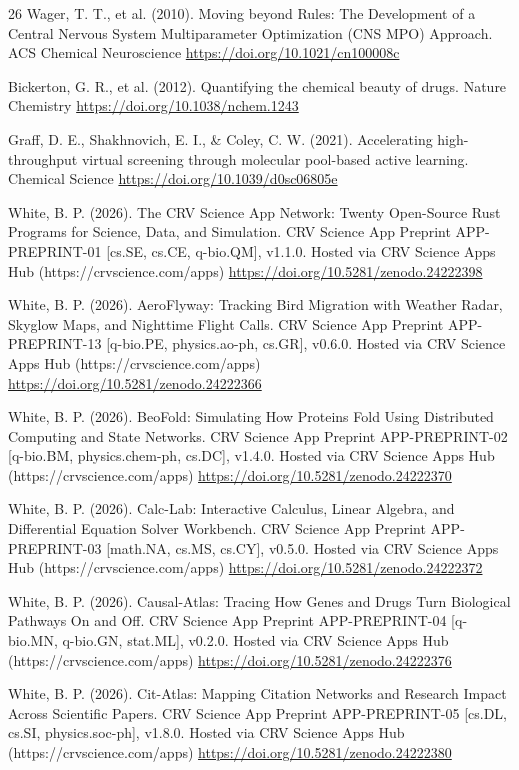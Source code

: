 \documentclass[10pt,letterpaper]{article}
\begin{document}
\begin{thebibliography}{26}
 Wager, T. T., et al. (2010). Moving beyond Rules: The Development of a Central Nervous System Multiparameter Optimization (CNS MPO) Approach. ACS Chemical Neuroscience \url{https://doi.org/10.1021/cn100008c}

 Bickerton, G. R., et al. (2012). Quantifying the chemical beauty of drugs. Nature Chemistry \url{https://doi.org/10.1038/nchem.1243}

 Graff, D. E., Shakhnovich, E. I., \& Coley, C. W. (2021). Accelerating high-throughput virtual screening through molecular pool-based active learning. Chemical Science \url{https://doi.org/10.1039/d0sc06805e}

 White, B. P. (2026). The CRV Science App Network: Twenty Open-Source Rust Programs for Science, Data, and Simulation. CRV Science App Preprint APP-PREPRINT-01 [cs.SE, cs.CE, q-bio.QM], v1.1.0. Hosted via CRV Science Apps Hub (https://crvscience.com/apps) \url{https://doi.org/10.5281/zenodo.24222398}

 White, B. P. (2026). AeroFlyway: Tracking Bird Migration with Weather Radar, Skyglow Maps, and Nighttime Flight Calls. CRV Science App Preprint APP-PREPRINT-13 [q-bio.PE, physics.ao-ph, cs.GR], v0.6.0. Hosted via CRV Science Apps Hub (https://crvscience.com/apps) \url{https://doi.org/10.5281/zenodo.24222366}

 White, B. P. (2026). BeoFold: Simulating How Proteins Fold Using Distributed Computing and State Networks. CRV Science App Preprint APP-PREPRINT-02 [q-bio.BM, physics.chem-ph, cs.DC], v1.4.0. Hosted via CRV Science Apps Hub (https://crvscience.com/apps) \url{https://doi.org/10.5281/zenodo.24222370}

 White, B. P. (2026). Calc-Lab: Interactive Calculus, Linear Algebra, and Differential Equation Solver Workbench. CRV Science App Preprint APP-PREPRINT-03 [math.NA, cs.MS, cs.CY], v0.5.0. Hosted via CRV Science Apps Hub (https://crvscience.com/apps) \url{https://doi.org/10.5281/zenodo.24222372}

 White, B. P. (2026). Causal-Atlas: Tracing How Genes and Drugs Turn Biological Pathways On and Off. CRV Science App Preprint APP-PREPRINT-04 [q-bio.MN, q-bio.GN, stat.ML], v0.2.0. Hosted via CRV Science Apps Hub (https://crvscience.com/apps) \url{https://doi.org/10.5281/zenodo.24222376}

 White, B. P. (2026). Cit-Atlas: Mapping Citation Networks and Research Impact Across Scientific Papers. CRV Science App Preprint APP-PREPRINT-05 [cs.DL, cs.SI, physics.soc-ph], v1.8.0. Hosted via CRV Science Apps Hub (https://crvscience.com/apps) \url{https://doi.org/10.5281/zenodo.24222380}


\end{thebibliography}
\end{document}
